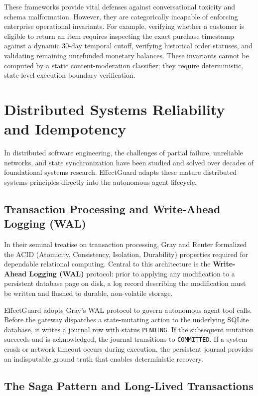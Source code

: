These frameworks provide vital defenses against conversational toxicity and schema malformation. However, they are categorically incapable of enforcing enterprise operational invariants. For example, verifying whether a customer is eligible to return an item requires inspecting the exact purchase timestamp against a dynamic 30-day temporal cutoff, verifying historical order statuses, and validating remaining unrefunded monetary balances. These invariants cannot be computed by a static content-moderation classifier; they require deterministic, state-level execution boundary verification.

\section{Distributed Systems Reliability and Idempotency}

In distributed software engineering, the challenges of partial failure, unreliable networks, and state synchronization have been studied and solved over decades of foundational systems research. EffectGuard adapts these mature distributed systems principles directly into the autonomous agent lifecycle.

\subsection{Transaction Processing and Write-Ahead Logging (WAL)}

In their seminal treatise on transaction processing, Gray and Reuter \cite{gray1993transaction} formalized the ACID (Atomicity, Consistency, Isolation, Durability) properties required for dependable relational computing. Central to this architecture is the \textbf{Write-Ahead Logging (WAL)} protocol: prior to applying any modification to a persistent database page on disk, a log record describing the modification must be written and flushed to durable, non-volatile storage.

EffectGuard adopts Gray's WAL protocol to govern autonomous agent tool calls. Before the gateway dispatches a state-mutating action to the underlying SQLite database, it writes a journal row with status \texttt{PENDING}. If the subsequent mutation succeeds and is acknowledged, the journal transitions to \texttt{COMMITTED}. If a system crash or network timeout occurs during execution, the persistent journal provides an indisputable ground truth that enables deterministic recovery.

\subsection{The Saga Pattern and Long-Lived Transactions}

